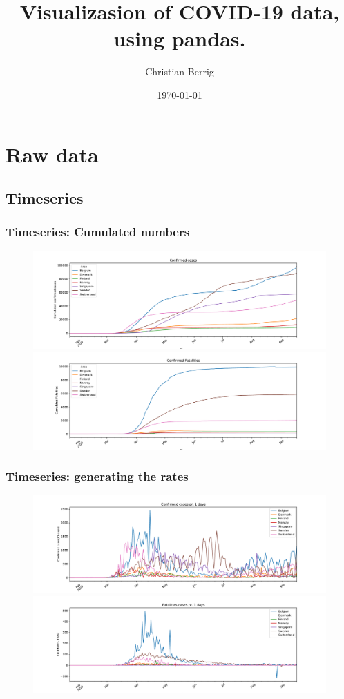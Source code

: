 \documentclass{beamer}
\title{Visualizasion of COVID-19 data, using pandas.}
\author{Christian Berrig}
\institute{Roskilde University}
\date{\today}
\begin{document}
\begin{frame}
\titlepage
\end{frame}

\section{Raw data}
\subsection{Timeseries}

\begin{frame}
\frametitle{Timeseries: Cumulated numbers}
\begin{figure}[H]
\includegraphics[width=\textwidth]{../figs/confirmed_timeseries_linear.pdf}
\includegraphics[width=\textwidth]{../figs/deaths_timeseries_linear.pdf}
\end{figure}
\end{frame}

\begin{frame}
\frametitle{Timeseries: generating the rates}
\begin{figure}[H]
\includegraphics[width=\textwidth]{../figs/confirmed_rate_timeseries_1days_linear.pdf}
\includegraphics[width=\textwidth]{../figs/deaths_rate_timeseries_1days_linear.pdf}
\end{figure}
\end{frame}
\end{document}
